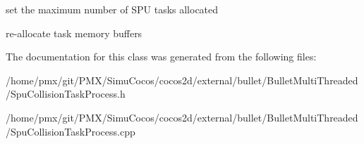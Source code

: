 set the maximum number of S\+PU tasks allocated 

re-\/allocate task memory buffers 

The documentation for this class was generated from the following files\+:\begin{DoxyCompactItemize}
\item 
/home/pmx/git/\+P\+M\+X/\+Simu\+Cocos/cocos2d/external/bullet/\+Bullet\+Multi\+Threaded/Spu\+Collision\+Task\+Process.\+h\item 
/home/pmx/git/\+P\+M\+X/\+Simu\+Cocos/cocos2d/external/bullet/\+Bullet\+Multi\+Threaded/Spu\+Collision\+Task\+Process.\+cpp\end{DoxyCompactItemize}
